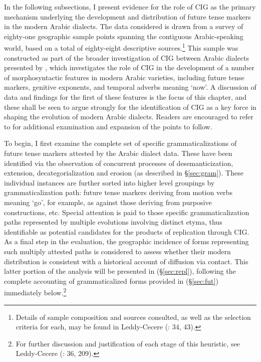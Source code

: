 \documentclass[output=paper]{langsci/langscibook}
\begin{document}
In the following subsections, I present evidence for the role of CIG as the primary mechanism underlying the development and distribution of future tense markers in the modern Arabic dialects. The data considered is drawn from a survey of eighty-one geographic sample points spanning the contiguous Arabic-speaking world, based on a total of eighty-eight descriptive sources.\footnote{Details of sample composition and sources consulted, as well as the selection criteria for each,  may be found in Leddy-Cecere (\citeyear{Leddy-Cecere2018}: 34, 43).} This sample was constructed as part of the broader investigation of CIG between Arabic dialects presented by \citet{Leddy-Cecere2018}, which investigates the role of CIG in the development of a number of morphosyntactic features in modern Arabic varieties, including future tense markers, genitive exponents, and temporal adverbs meaning ‘now’. A discussion of data and findings for the first of these features is the focus of this chapter, and these shall be seen to argue strongly for the identification of CIG as a key force in shaping the evolution of modern Arabic dialects.  Readers are encouraged to refer to \citet{Leddy-Cecere2018} for additional examination and expansion of the points to follow.

To begin, I first examine the complete set of specific grammaticalizations of future tense markers attested by the Arabic dialect data. These have been identified via the observation of concurrent processes of desemanticization, extension, decategorialization and erosion (as described in §\ref{sec:gram}). These individual instances are further sorted into higher level groupings by grammaticalization path: future tense markers deriving from motion verbs meaning ‘go’, for example, as against those deriving from purposive constructions, etc. Special attention is paid to those specific grammaticalization paths represented by multiple evolutions involving distinct etyma, thus identifiable as potential candidates for the products of replication through CIG. As a final step in the evaluation, the geographic incidence of forms representing such multiply attested paths is considered to assess whether their modern distribution is consistent with a historical account of diffusion via contact. This latter portion of the analysis will be presented in (§\ref{sec:repl}), following the complete accounting of grammaticalized forms provided in (§\ref{sec:fut}) immediately below.\footnote{For further discussion and justification of each stage of this heuristic, see Leddy-Cecere (\citeyear{Leddy-Cecere2018}: 36, 209).}
\end{document}
